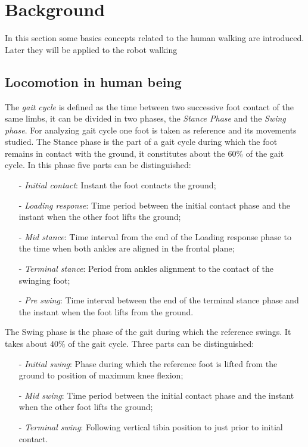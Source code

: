 \section{Background}
In this section some basics concepts related to the human walking are introduced. Later they will
be applied to the robot walking 
\subsection{Locomotion in human being}
The \emph{gait cycle} is defined as the time between two successive foot contact of the same limbs,
it can be divided in two phases, the \emph{Stance Phase}  and the \emph{Swing phase}.
For analyzing gait cycle one foot is taken as reference and its movements studied.
The Stance phase is the part of a gait cycle during which the foot remains in contact with the
ground, it constitutes about the $60\%$ of the gait cycle. In this phase five parts can be
distinguished:
\begin{itemize}
\item [-]\emph{Initial contact}: Instant the foot contacts the ground;
\item [-]\emph{Loading response}: Time period between the initial contact phase and the instant
  when the other foot lifts the ground;
\item [-]\emph{Mid stance}: Time interval from the end of the Loading response phase to the time
  when both ankles are aligned in the frontal plane;
\item[-]\emph{Terminal stance}: Period from ankles alignment to the contact of the swinging foot;
\item[-]\emph{Pre swing}: Time interval between the end of the terminal stance phase and the instant
  when the foot lifts from the ground.
\end{itemize}
The Swing phase is the phase of the gait during which the reference swings. It takes about $40\%$ of the gait cycle. Three parts can be distinguished:
\begin{itemize}
\item [-]\emph{Initial swing}: Phase during which the reference foot is lifted from the ground
  to position of maximum  knee flexion;
\item [-]\emph{Mid swing}: Time period between the initial contact phase and the instant when the other foot lifts the ground;
\item[-]\emph{Terminal swing}: Following vertical tibia position to just prior to initial contact.
\end{itemize}

